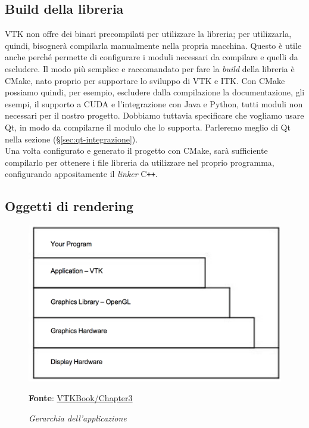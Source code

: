 \subsection{Build della libreria}\label{sec:build-liberia}
VTK non offre dei binari precompilati per utilizzare la libreria; per utilizzarla, quindi, bisognerà compilarla manualmente nella propria macchina. Questo è utile anche perché permette di configurare i moduli necessari da compilare e quelli da escludere. Il modo più semplice e raccomandato per fare la \emph{build} della libreria è CMake, nato proprio per supportare lo sviluppo di VTK e ITK. Con CMake possiamo quindi, per esempio, escludere dalla compilazione la documentazione, gli esempi, il supporto a CUDA e l'integrazione con Java e Python, tutti moduli non necessari per il nostro progetto. Dobbiamo tuttavia specificare che vogliamo usare Qt, in modo da compilarne il modulo che lo supporta. Parleremo meglio di Qt nella sezione  (§\ref{sec:qt-integrazione}).
\\
Una volta configurato e generato il progetto con CMake, sarà sufficiente compilarlo per ottenere i file libreria da utilizzare nel proprio programma, configurando appositamente il \emph{linker} C\texttt{++}.

\subsection{Oggetti di rendering}\label{sec:oggetti-rendering}
\begin{figure}[h]
    \centering
    \includegraphics[scale=0.4]{immagini/volumerendering/layers.png}
    \caption{\textit{Gerarchia dell'applicazione}}
    \textbf{Fonte}: \href{https://lorensen.github.io/VTKExamples/site/VTKBook/03Chapter3/}{VTKBook/Chapter3}
    \label{fig: vtk-layers}
\end{figure}

